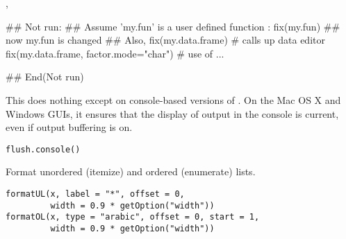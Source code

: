 %
\begin{SeeAlso}\relax
{},
\end{SeeAlso}
%
\begin{Examples}
\begin{ExampleCode}
## Not run: 
 ## Assume 'my.fun' is a user defined function :
 fix(my.fun)
 ## now my.fun is changed
 ## Also,
 fix(my.data.frame) # calls up data editor
 fix(my.data.frame, factor.mode="char") # use of ...

## End(Not run)
\end{ExampleCode}
\end{Examples}
%
\begin{Description}\relax
This does nothing except on console-based versions of \R{}.
On the Mac OS X and Windows GUIs, it ensures that the display of
output in the console is current, even if output buffering is on.
\end{Description}
%
\begin{Usage}
\begin{verbatim}
flush.console()
\end{verbatim}
\end{Usage}
%
\begin{Description}\relax
Format unordered (itemize) and ordered (enumerate) lists.
\end{Description}
%
\begin{Usage}
\begin{verbatim}
formatUL(x, label = "*", offset = 0,
         width = 0.9 * getOption("width"))
formatOL(x, type = "arabic", offset = 0, start = 1,
         width = 0.9 * getOption("width"))
\end{verbatim}
\end{Usage}
%
